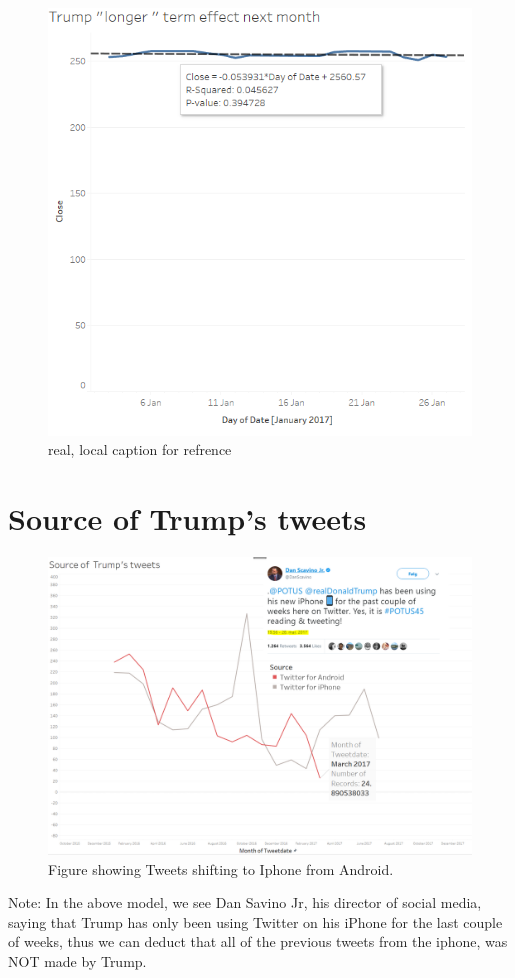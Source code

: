 \documentclass[12pt]{article}
\begin{document}
\begin{figure}[H] %
	\centering %
\includegraphics [scale= 1]  {TrumpJanuaryEffect.PNG}    %
	\caption[Optional caption] {real, local caption for refrence}
	\label{fig:wordcloudBliz}

\end{figure}

\section{Source of Trump's tweets \\}

\begin{figure}[h] %
	\centering %
\includegraphics [scale= .3]  {trump2.png}    %
	\caption[Optional caption] {Figure showing Tweets shifting to Iphone from Android.}
	\label{fig:wordcloudBliz}

\end{figure}

Note: In the above model, we see Dan Savino Jr, his director of social media, saying that Trump has only been using Twitter on his iPhone for the last couple of weeks, thus we can deduct that all of the previous tweets from the iphone, was NOT made by Trump.
\end{document}
